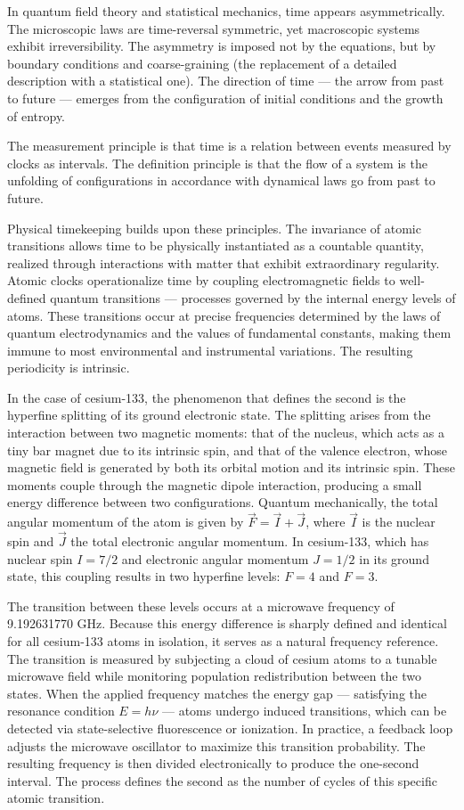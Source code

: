 In quantum field theory and statistical mechanics, time appears asymmetrically. The microscopic laws are time-reversal symmetric, yet macroscopic systems exhibit irreversibility. The asymmetry is imposed not by the equations, but by boundary conditions and coarse-graining (the replacement of a detailed description with a statistical one). The direction of time — the arrow from past to future — emerges from the configuration of initial conditions and the growth of entropy.

The measurement principle is that time is a relation between events measured by clocks as intervals. The definition principle is that the flow of a system is the unfolding of configurations in accordance with dynamical laws go from past to future. 

Physical timekeeping builds upon these principles. The invariance of atomic transitions allows time to be physically instantiated as a countable quantity, realized through interactions with matter that exhibit extraordinary regularity. Atomic clocks operationalize time by coupling electromagnetic fields to well-defined quantum transitions — processes governed by the internal energy levels of atoms. These transitions occur at precise frequencies determined by the laws of quantum electrodynamics and the values of fundamental constants, making them immune to most environmental and instrumental variations. The resulting periodicity is intrinsic.

In the case of cesium-133, the phenomenon that defines the second is the hyperfine splitting of its ground electronic state. The splitting arises from the interaction between two magnetic moments: that of the nucleus, which acts as a tiny bar magnet due to its intrinsic spin, and that of the valence electron, whose magnetic field is generated by both its orbital motion and its intrinsic spin. These moments couple through the magnetic dipole interaction, producing a small energy difference between two configurations. Quantum mechanically, the total angular momentum of the atom is given by $\vec{F} = \vec{I} + \vec{J}$, where $\vec{I}$ is the nuclear spin and $\vec{J}$ the total electronic angular momentum. In cesium-133, which has nuclear spin $I = 7/2$ and electronic angular momentum $J = 1/2$ in its ground state, this coupling results in two hyperfine levels: $F = 4$ and $F = 3$.

The transition between these levels occurs at a microwave frequency of 9.192631770 GHz. Because this energy difference is sharply defined and identical for all cesium-133 atoms in isolation, it serves as a natural frequency reference. The transition is measured by subjecting a cloud of cesium atoms to a tunable microwave field while monitoring population redistribution between the two states. When the applied frequency matches the energy gap — satisfying the resonance condition $E = h\nu$ — atoms undergo induced transitions, which can be detected via state-selective fluorescence or ionization. In practice, a feedback loop adjusts the microwave oscillator to maximize this transition probability. The resulting frequency is then divided electronically to produce the one-second interval. The process defines the second as the number of cycles of this specific atomic transition. 

